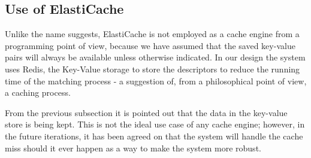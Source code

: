 \subsection{Use of ElastiCache}

Unlike the name suggests, ElastiCache is not employed as a cache engine from a programming point of view, because we have assumed that the saved key-value pairs will always be available unless otherwise indicated. In our design the system uses Redis, the Key-Value storage to store the descriptors to reduce the running time of the matching process - a suggestion of, from a philosophical point of view, a caching process.

From the previous subsection it is pointed out that the data in the key-value store is being kept. This is not the ideal use case of any cache engine; however, in the future iterations, it has been agreed on that the system will handle the cache miss should it ever happen as a way to make the system more robust.